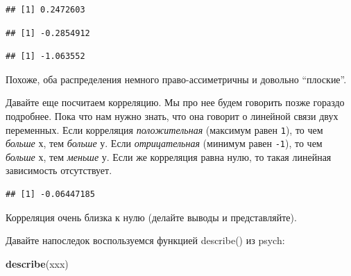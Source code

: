 \documentclass[]{book}
\newenvironment{Shaded}{\begin{snugshade}}{\end{snugshade}}
\newcommand{\KeywordTok}[1]{\textcolor[rgb]{0.13,0.29,0.53}{\textbf{#1}}}
\newcommand{\OperatorTok}[1]{\textcolor[rgb]{0.81,0.36,0.00}{\textbf{#1}}}
\newcommand{\NormalTok}[1]{#1}
\begin{document}
\begin{verbatim}
## [1] 0.2472603
\end{verbatim}

\begin{Shaded}
\end{Shaded}

\begin{verbatim}
## [1] -0.2854912
\end{verbatim}

\begin{Shaded}
\end{Shaded}

\begin{verbatim}
## [1] -1.063552
\end{verbatim}

Похоже, оба распределения немного право-ассиметричны и довольно
``плоские''.

Давайте еще посчитаем корреляцию. Мы про нее будем говорить позже
гораздо подробнее. Пока что нам нужно знать, что она говорит о линейной
связи двух переменных. Если корреляция \emph{положительная} (максимум
равен \texttt{1}), то чем \emph{больше} х, тем \emph{больше} у. Если
\emph{отрицательная} (минимум равен \texttt{-1}), то чем \emph{больше}
х, тем \emph{меньше} у. Если же корреляция равна нулю, то такая линейная
зависимость отсутствует.

\begin{Shaded}
\end{Shaded}

\begin{verbatim}
## [1] -0.06447185
\end{verbatim}

Корреляция очень близка к нулю (делайте выводы и представляйте).

Давайте напоследок воспользуемся функцией describe() из psych:

\begin{Shaded}
\begin{Highlighting}[]
\KeywordTok{describe}\NormalTok{(xxx)}
\end{Highlighting}
\end{Shaded}
\end{document}
